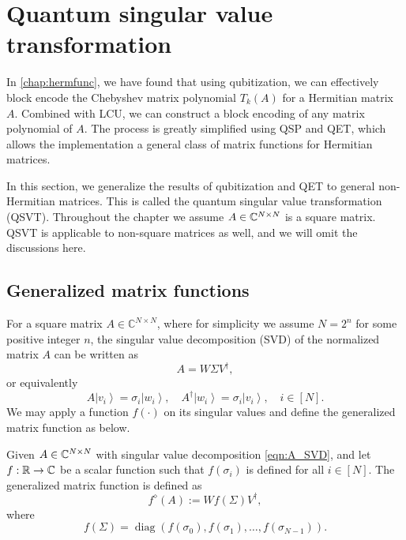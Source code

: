 \chapter{Quantum singular value transformation}\label{chap:qsvt}

In \cref{chap:hermfunc}, we have found that using qubitization, we can effectively block encode the Chebyshev matrix polynomial $T_k(A)$ for a Hermitian matrix $A$.
Combined with LCU, we can construct a block encoding of any matrix polynomial of $A$.
The process is greatly simplified using QSP and QET, which allows the implementation a general class of matrix functions for Hermitian matrices.

In this section, we generalize the results of qubitization and QET to general non-Hermitian matrices. 
This is called the quantum singular value transformation (QSVT).
Throughout the chapter we assume $A\in\mathbb{C}^{N\times N}$ is a square matrix.
QSVT is applicable to non-square matrices as well, and we will omit the discussions here.




\section{Generalized matrix functions}


For a square matrix $A \in \mathbb{C}^{N \times N}$, where for simplicity we assume $N=2^n$ for some positive integer $n$, the singular value decomposition (SVD) of the normalized matrix $A$ can be written as
\begin{equation}
A=W\Sigma V^{\dag},
\label{eqn:A_SVD}
\end{equation}
or equivalently
\begin{equation}
A\left|v_{i}\right\rangle= \sigma_{i}\left|w_{i}\right\rangle, \quad A^{\dagger}\left|w_{i}\right\rangle= \sigma_{i}\left|v_{i}\right\rangle, \quad i\in [N].
\label{eqn:A_svd_component}
\end{equation}
We may apply a function $f(\cdot)$ on its singular values and define the generalized matrix function \cite{HawkinsBen-Israel1973,ArrigoBenziFenu2016} as below.

\begin{defn}
\label{def:gen_matrix_function}
Given $A\in\mathbb{C}^{N\times N}$ with singular value decomposition \cref{eqn:A_SVD}, and let $f: \mathbb{R} \rightarrow \mathbb{\mathbb{C}}$ be a scalar function such that $f\left(\sigma_{i}\right)$ is defined for all $i\in[N]$. The generalized matrix function is defined as
\begin{equation}
f^{\diamond}(A):=Wf(\Sigma)V^{\dag},
\label{eqn:gen_matrix_function}
\end{equation}
where 
$$
f\left(\Sigma\right)=\operatorname{diag}\left(f\left(\sigma_{0}\right), f\left(\sigma_{1}\right), \ldots, f\left(\sigma_{N-1}\right)\right).
$$
\end{defn}

